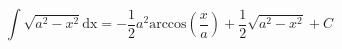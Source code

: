 $$ 
  \int \sqrt{a^2 - x^2} \mathrm{dx} 
  = - \frac{1}{2} a^2 \mathrm{arccos}\left( \frac{x}{a} \right ) + \frac{1}{2}\sqrt{a^2 - x^2} + C
  $$